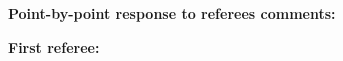 \documentclass[11pt,a4paper,sans]{moderncv}        %
\begin{document}
  
  
\medskip
\textbf{Point-by-point response to referees comments:}

\medskip

\textbf{First referee:}

\medskip

\end{document}
